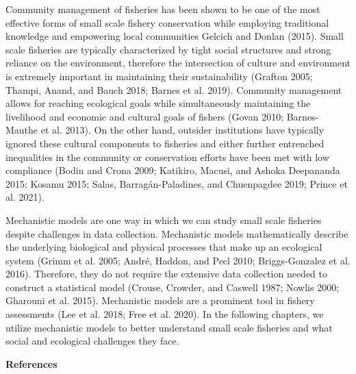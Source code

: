 \documentclass[
]{article}
\begin{document}
Community management of fisheries has been shown to be one of the most effective forms of small scale fishery conservation while employing traditional knowledge and empowering local communities Gelcich and Donlan (2015). Small scale fisheries are typically characterized by tight social structures and strong reliance on the environment, therefore the intersection of culture and environment is extremely important in maintaining their sustainability (Grafton 2005; Thampi, Anand, and Bauch 2018; Barnes et al. 2019). Community management allows for reaching ecological goals while simultaneously maintaining the livelihood and economic and cultural goals of fishers (Govan 2010; Barnes-Mauthe et al. 2013). On the other hand, outsider institutions have typically ignored these cultural components to fisheries and either further entrenched inequalities in the community or conservation efforts have been met with low compliance (Bodin and Crona 2009; Katikiro, Macusi, and Ashoka Deepananda 2015; Kosamu 2015; Salas, Barragán-Paladines, and Chuenpagdee 2019; Prince et al. 2021).

Mechanistic models are one way in which we can study small scale fisheries despite challenges in data collection. Mechanistic models mathematically describe the underlying biological and physical processes that make up an ecological system (Grimm et al. 2005; André, Haddon, and Pecl 2010; Briggs-Gonzalez et al. 2016). Therefore, they do not require the extensive data collection needed to construct a statistical model (Crouse, Crowder, and Caswell 1987; Nowlis 2000; Gharouni et al. 2015). Mechanistic models are a prominent tool in fishery assessments (Lee et al. 2018; Free et al. 2020). In the following chapters, we utilize mechanistic models to better understand small scale fisheries and what social and ecological challenges they face.

\newpage

\textbf{References}
\end{document}
